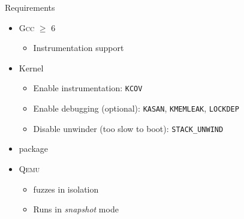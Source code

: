 \begin{frame}{\syz}{Requirements}

  \begin{itemize}
    \item \textsc{Gcc} $\geq$ 6
    \begin{itemize}
      \item Instrumentation support
    \end{itemize}

    \pause

    \item Kernel
    \begin{itemize}
      \item Enable instrumentation: \texttt{KCOV}
      \item Enable debugging (optional): \texttt{KASAN}, \texttt{KMEMLEAK},
	\texttt{LOCKDEP}

      \pause

      \item Disable unwinder (too slow to boot): \texttt{STACK\_UNWIND}
    \end{itemize}

    \pause

    \item \syz package

    \pause

    \item \textsc{Qemu}
    \begin{itemize}
      \item \syz fuzzes in isolation

      \pause

      \item Runs in \emph{snapshot} mode
    \end{itemize}
  \end{itemize}

\end{frame}

